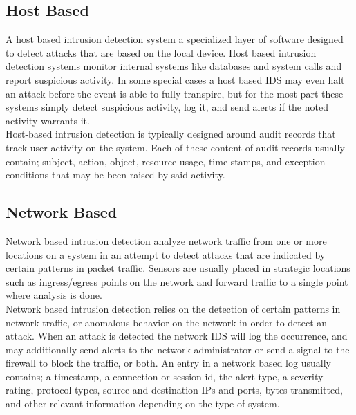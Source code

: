 \documentclass[12pt]{article} %
\begin{document}
\subsection{Host Based}
A host based intrusion detection system a specialized layer of software designed to detect attacks that are based on the local device. Host based intrusion detection systems monitor internal systems like databases and system calls and report suspicious activity. In some special cases a host based IDS may even halt an attack before the event is able to fully transpire, but for the most part these systems simply detect suspicious activity, log it, and send alerts if the noted activity warrants it.\\
Host-based intrusion detection is typically designed around audit records that track user activity on the system. Each of these content of audit records usually contain; subject, action, object, resource usage, time stamps, and exception conditions that may be been raised by said activity.\\

\subsection{Network Based}
Network based intrusion detection analyze network traffic from one or more locations on a system in an attempt to detect attacks that are indicated by certain patterns in packet traffic. Sensors are usually placed in strategic locations such as ingress/egress points on the network and forward traffic to a single point where analysis is done.\\
Network based intrusion detection relies on the detection of certain patterns in network traffic, or anomalous behavior on the network in order to detect an attack. When an attack is detected the network IDS will log the occurrence, and may additionally send alerts to the network administrator or send a signal to the firewall to block the traffic, or both. An entry in a network based log usually contains; a timestamp, a connection or session id, the alert type, a severity rating, protocol types, source and destination IPs and ports, bytes transmitted, and other relevant information depending on the type of system.\\
\end{document}
